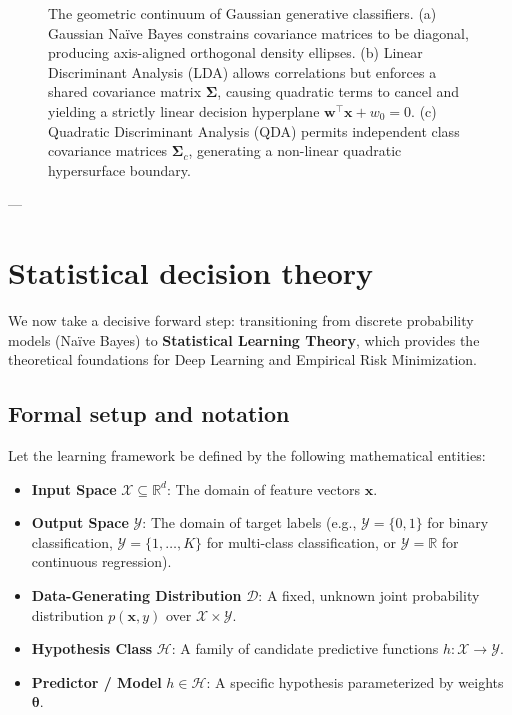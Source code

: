 \begin{figure}[H]
\caption{The geometric continuum of Gaussian generative classifiers. (a) Gaussian Naïve Bayes constrains covariance matrices to be diagonal, producing axis-aligned orthogonal density ellipses. (b) Linear Discriminant Analysis (LDA) allows correlations but enforces a shared covariance matrix $\boldsymbol{\Sigma}$, causing quadratic terms to cancel and yielding a strictly linear decision hyperplane $\mathbf{w}^\top \mathbf{x} + w_0 = 0$. (c) Quadratic Discriminant Analysis (QDA) permits independent class covariance matrices $\boldsymbol{\Sigma}_c$, generating a non-linear quadratic hypersurface boundary.}
\label{fig:generative_classifiers_comparison}
\end{figure}

---

\section{Statistical decision theory}
\label{sec:statistical_learning_theory}

We now take a decisive forward step: transitioning from discrete probability models (Naïve Bayes) to \textbf{Statistical Learning Theory}, which provides the theoretical foundations for Deep Learning and Empirical Risk Minimization.

\subsection{Formal setup and notation}
\label{sec:slt_notation}

Let the learning framework be defined by the following mathematical entities:
\begin{itemize}[noitemsep]
  \item \textbf{Input Space} $\mathcal{X} \subseteq \mathbb{R}^d$: The domain of feature vectors $\mathbf{x}$.
  \item \textbf{Output Space} $\mathcal{Y}$: The domain of target labels (e.g., $\mathcal{Y} = \{0, 1\}$ for binary classification, $\mathcal{Y} = \{1, \dots, K\}$ for multi-class classification, or $\mathcal{Y} = \mathbb{R}$ for continuous regression).
  \item \textbf{Data-Generating Distribution} $\mathcal{D}$: A fixed, unknown joint probability distribution $p(\mathbf{x}, y)$ over $\mathcal{X} \times \mathcal{Y}$.
  \item \textbf{Hypothesis Class} $\mathcal{H}$: A family of candidate predictive functions $h: \mathcal{X} \to \mathcal{Y}$.
  \item \textbf{Predictor / Model} $h \in \mathcal{H}$: A specific hypothesis parameterized by weights $\boldsymbol{\theta}$.
\end{itemize}

